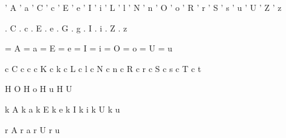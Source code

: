  ' A {\Aacute}         ' a {\aacute}
 ' C {\Cacute}         ' c {\cacute}
 ' E {\Eacute}         ' e {\eacute}
 ' I {\Iacute}         ' i {\iacute}
 ' L {\Lacute}         ' l {\lacute}
 ' N {\Nacute}         ' n {\nacute}
 ' O {\Oacute}         ' o {\oacute}
 ' R {\Racute}         ' r {\racute}
 ' S {\Sacute}         ' s {\sacute}
 ' u {\uacute}         ' U {\Uacute}
 ' Z {\Zacute}         ' z {\zacute}

 . C {\Cdotaccent}     . c {\cdotaccent}
 . E {\Edotaccent}     . e {\edotaccent}
 . G {\Gdotaccent}     . g {\gdotaccent}
 . I {\Idotaccent}     . i {\idotaccent}
 . Z {\Zdotaccent}     . z {\zdotaccent}

 = A {\Amacron}        = a {\amacron}
 = E {\Emacron}        = e {\emacron}
 = I {\Imacron}        = i {\imacron}
 = O {\Omacron}        = o {\omacron}
 = U {\Umacron}        = u {\umacron}

 c C {\Ccedilla}       c c {\ccedilla}
 c K {\Kcedilla}       c k {\kcedilla}
 c L {\Lcedilla}       c l {\lcedilla}
 c N {\Ncedilla}       c n {\ncedilla}
 c R {\Rcedilla}       c r {\rcedilla}
 c S {\Scedilla}       c s {\scedilla}
 c T {\Tcedilla}       c t {\tcedilla}

 H O {\Ohungarumlaut}  H o {\ohungarumlaut}
 H u {\uhungarumlaut}  H U {\Uhungarumlaut}

 k A {\Aogonek}        k a {\aogonek}
 k E {\Eogonek}        k e {\eogonek}
 k I {\Iogonek}        k i {\iogonek}
 k U {\Uogonek}        k u {\uogonek}

 r A {\Aring}          r a {\aring}
 r U {\Uring}          r u {\uring}


